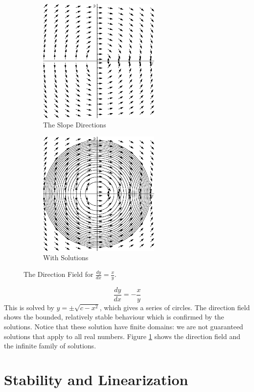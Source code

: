 \documentclass[fleqn,letterpaper]{report}
\begin{document}
\begin{figure}[t]
\centering
\begin{subfigure}{.5\textwidth}
\centering
\includegraphics[width=6cm]{figure14.eps}
\caption{The Slope Directions}
\end{subfigure}%
\begin{subfigure}{.5\textwidth}
\centering
\includegraphics[width=6cm]{figure15.eps}
\caption{With Solutions}
\end{subfigure}
\caption{The Direction Field for $\frac{dy}{dx} = \frac{x}{y}$.}
\label{figure-direction-field5}
\end{figure}

\begin{example}
\begin{equation*}
\frac{dy}{dx} = -\frac{x}{y}
\end{equation*}
This is solved by $y = \pm \sqrt{c-x^2}$, which gives a series
of circles. The direction field shows the bounded, relatively
stable behaviour which is confirmed by the solutions. Notice
that these solution have finite domains: we are not guaranteed
solutions that apply to all real numbers. Figure
\ref{figure-direction-field5} shows the direction field and the infinite
family of solutions.
\end{example}

\section{Stability and Linearization}
\label{stability-and-linearization}
\end{document}
